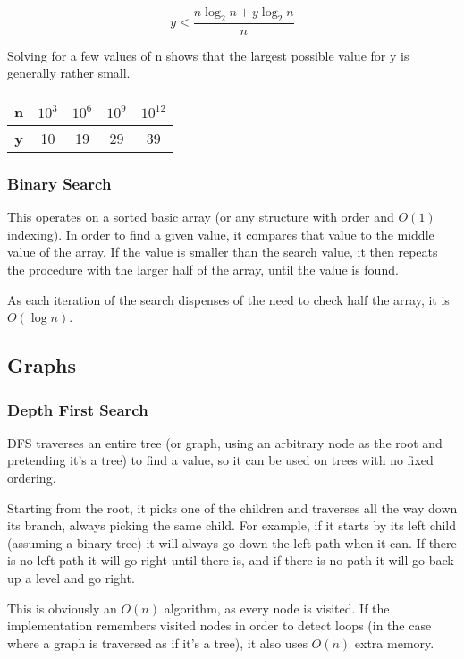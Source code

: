 \documentclass[]{article}
\begin{document}
\[y < \frac{n\log_{2}{n} + y\log_{2}{n}}{n}\]

Solving for a few values of n shows that the largest possible value for y is generally rather small.

\begin{table}[h]
	\centering
\begin{tabular}{|c|c|c|c|c|}
	\hline \textbf {n} & $10^3$ & $10^6$ & $10^9$ & $10^{12}$ \\
	\hline \textbf{y} & 10 & 19 & 29 & 39 \\
	\hline 
\end{tabular}
\end{table}

\subsubsection{Binary Search}

This operates on a sorted basic array (or any structure with order and $O(1)$ indexing). In order to find a given value, it compares that value to the middle value of the array. If the value is smaller than the search value, it then repeats the procedure with the larger half of the array, until the value is found.

As each iteration of the search dispenses of the need to check half the array, it is $O(\log{n})$.

\pagebreak

\subsection{Graphs}

\subsubsection{Depth First Search}

DFS traverses an entire tree (or graph, using an arbitrary node as the root and pretending it's a tree) to find a value, so it can be used on trees with no fixed ordering.

Starting from the root, it picks one of the children and traverses all the way down its branch, always picking the same child. For example, if it starts by its left child (assuming a binary tree) it will always go down the left path when it can. If there is no left path it will go right until there is, and if there is no path it will go back up a level and go right.

This is obviously an $O(n)$ algorithm, as every node is visited. If the implementation remembers visited nodes in order to detect loops (in the case where a graph is traversed as if it's a tree), it also uses $O(n)$ extra memory.
\end{document}
